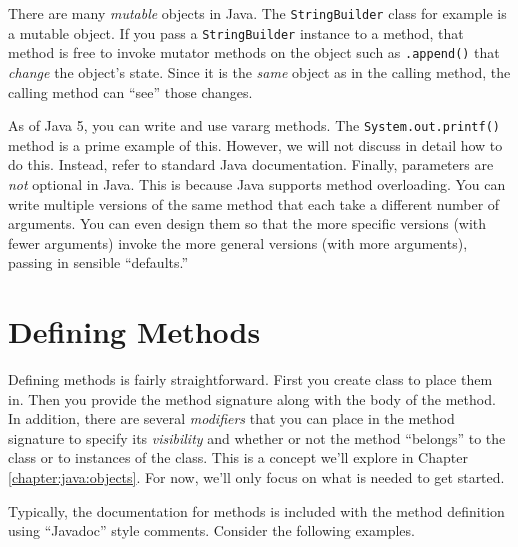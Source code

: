 There are many \emph{mutable} objects in Java.  The 
\texttt{StringBuilder} class for example is a mutable
object.  If you pass a \texttt{StringBuilder} instance
to a method, that method is free to invoke mutator methods 
on the object such as \texttt{.append()} that 
\emph{change} the object's state.  Since
it is the \emph{same} object as in the calling method, the
calling method can ``see'' those changes.

As of Java 5, you can write and use 
vararg methods.  The
\texttt{System.out.printf()} method is a prime
example of this.  However, we will not discuss in detail how
to do this.  Instead, refer to standard Java documentation.
Finally, parameters are \emph{not} optional in Java.  This is because
Java supports method overloading.  You can write multiple
versions of the same method that each take a different
number of arguments.  You can even design them so that
the more specific versions (with fewer arguments) invoke
the more general versions (with more arguments), passing
in sensible ``defaults.''

\section{Defining Methods}

Defining methods is fairly straightforward.  First you create 
class to place them in.  Then you provide the method signature
along with the body of the method.  In addition, there are 
several \emph{modifiers} that you can place in the method 
signature to specify its 
\emph{visibility} and whether or not
the method ``belongs'' to the class or to instances of the 
class.  This is a concept we'll explore in Chapter \ref{chapter:java:objects}.
For now, we'll only focus on what is needed to get started.

Typically, the documentation for methods is included with 
the method definition using ``Javadoc'' style comments.
Consider the following examples.


